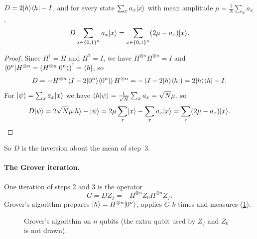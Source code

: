 \begin{lemma}\label{lem:diffusion-1006}
    $D = 2\lvert h \rangle\langle h \rvert - I$, and for every state $\sum_{x} a_x \lvert x \rangle$ with mean amplitude
    $\mu = \frac{1}{N} \sum_{x} a_x$,
    \[D \sum_{x \in \left\lbrace0,1\right\rbrace^n} a_x \lvert x \rangle = \sum_{x \in \left\lbrace0,1\right\rbrace^n} (2\mu - a_x) \lvert x \rangle.\]
\end{lemma}

\begin{proof}
    Since $H^\dagger = H$ and $H^2 = I$, we have $H^{\otimes n} H^{\otimes n} = I$ and
    $\langle 0^n \rvert H^{\otimes n} = \left(H^{\otimes n}\lvert 0^n \rangle\right)^\dagger = \langle h \rvert$, so
    \[D = -H^{\otimes n} \left(I - 2\lvert 0^n \rangle\langle 0^n \rvert\right) H^{\otimes n}
        = -\left(I - 2\lvert h \rangle\langle h \rvert\right) = 2\lvert h \rangle\langle h \rvert - I.\]
    For $\lvert \psi \rangle = \sum_x a_x \lvert x \rangle$ we have $\langle h \vert \psi \rangle = \frac{1}{\sqrt{N}} \sum_x a_x = \sqrt{N}\mu$, so
    \[D\lvert \psi \rangle = 2\sqrt{N}\mu \lvert h \rangle - \lvert \psi \rangle = 2\mu \sum_{x} \lvert x \rangle - \sum_{x} a_x \lvert x \rangle = \sum_{x} (2\mu - a_x) \lvert x \rangle. \qedhere\]
\end{proof}

So $D$ is the inversion about the mean of step~3.

\paragraph{The Grover iteration.} One iteration of steps 2 and 3 is the operator
\[G = D Z_f = -H^{\otimes n} Z_0 H^{\otimes n} Z_f.\]
Grover's algorithm prepares $\lvert h \rangle = H^{\otimes n}\lvert 0^n \rangle$, applies $G$ $k$ times and measures
(\cref{fig:grover-circuit-1006}).

\begin{figure}[ht]
    \centering
    \caption{Grover's algorithm on $n$ qubits (the extra qubit used by $Z_f$ and $Z_0$ is not drawn).}
    \label{fig:grover-circuit-1006}
\end{figure}

